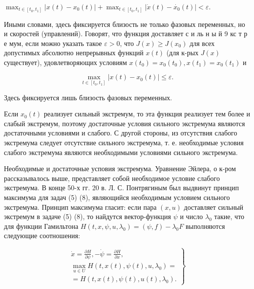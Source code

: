 \documentclass[10pt]{article}
\begin{document}
$\max _{t \in\left[t_{0}, t_{1}\right]}\left|x(t)-x_{0}(t)\right|+\max _{t \in\left[t_{0}, t_{1}\right]}\left|\dot{x}(t)-\dot{x_{0}}(t)\right|<\varepsilon$.



Иными словами, здесь фиксируется близость не только фазовых переменных, но и скоростей (управлений). Говорят, что функция доставляет с и ль н ы й 9 кс т р е мум, если можно указать такое $\varepsilon>0$, что $J(x) \geqslant J\left(x_{0}\right)$ для всех допустимых абсолютно непрерывных функций $x(t)$ (для к-рых $J(x)$ существует), удовлетворяющих условиям $x\left(t_{0}\right)=x_{0}\left(t_{0}\right), x\left(t_{1}\right)=x_{0}\left(t_{1}\right)$ и



\[

\max _{t \in\left[t_{0}, t_{1}\right]}\left|x(t)-x_{0}(t)\right| \leqslant \varepsilon .

\]



Здесь фиксируется лишь близость фазовых переменных.



Если $x_{0}(t)$ реализует сильный экстремум, то эта функция реализует тем более и слабый экстремум, поэтому достаточные условия сильного экстремума являются достаточными условиями и слабого. С другой стороны, из отсутствия слабого экстремума следует отсутствие сильного экстремума, т. е. необходимые условия слабого экстремума являются необходимыми условиями сильного экстремума.



Необходимые и достаточные усповия экстремума. Уравнение Эйлера, о к-ром рассказывалось выше, представляет собой необходимое условие слабого экстремума. В конце 50-х гг. 20 в. Л. С. Понтрягиным был выдвинут принцип максимума для задач (5) (8), являющийся необходимым условием сильного экстремума. Принцип максимума гласит: если пара $(x, u)$ доставляет сильный экстремум в задаче (5) (8), то найдутся вектор-функция $\psi$ и число $\lambda_{0}$ такие, что для функции Гамильтона $H\left(t, x, \psi, u, \lambda_{0}\right)=(\psi, f)-\lambda_{0} F$ выполняются следующие соотношения:



\[

\left.\begin{array}{c}

\dot{x}=\frac{\partial H}{\partial \psi},-\dot{\psi}=\frac{\partial H}{\partial x}, \\

\max _{u \in U} H\left(t, x(t), \psi(t), u, \lambda_{0}\right)= \\

=H\left(t, x(t), \psi(t), u(t), \lambda_{0}\right) .

\end{array}\right\}

\]
\end{document}
